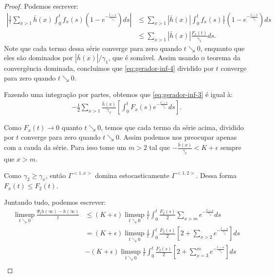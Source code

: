 \begin{proof}
  Podemos escrever:
  \begin{align*}
    \left| \frac{1}{t} \sum_{x > 1} \bar{h}(x) \int_0^t f_x (s) \left(
        1 - e^{-\frac{t-s}{\gamma_1}}
      \right) d s \right| &\leq
  \sum_{x > 1} |\bar{h}(x)| \int_0^t f_x (s) \frac{1}{t}\left(
    1 - e^{-\frac{t-s}{\gamma_1}}
  \right) d s \\
  & \leq \sum_{x > 1} |\bar{h}(x)| \frac{F_x(t)}{\gamma_1} d s  .
  \end{align*}
  Note que cada termo dessa série converge para zero quando $t
  \searrow 0$, enquanto que eles são dominados por $|\bar{h}(x)| /
  \gamma_1$, que é somável. Assim usando o teorema da convergência
  dominada, concluímos que \eqref{eq:gerador-inf-4} dividido por
  $t$ converge para zero quando $t \searrow 0$.

  Fazendo uma integração por partes, obtemos que
  \eqref{eq:gerador-inf-3} é igual à:
  \begin{align*}
    - \frac{1}{2} \sum_{x > 1} \frac{\bar{h}(x)}{\gamma_x} \left[
      \int_0^t F_x (s) e^{-\frac{t-s}{\gamma_x}} ds
    \right].
  \end{align*}

  Como $F_x(t) \to 0$ quanto $t \searrow 0$, temos que cada termo da
  série acima, dividido por $t$ converge para zero quando $t \searrow
  0$. Assim podemos nos preocupar apenas com a cauda da série. Para
  isso tome um $m > 2$ tal que $-\frac{\bar{h}(x)}{\gamma_x} < K +
  \epsilon$ sempre que $x > m$.

  Como $\gamma_2\geq \gamma_x$, então $\Gamma^{<1, x>}$ domina
  estocasticamente $\Gamma^{<1, 2>}$. Dessa forma $F_x(t) \leq
  F_2(t)$.

  Juntando tudo, podemos escrever:
  \begin{align*}
    \limsup_{t \searrow 0} \frac{\Psi_t h(\infty) - h(\infty)}{t}
    &\leq \left( K + \epsilon \right) \limsup_{t \searrow
      0}\frac{1}{t} \int_0^t \frac{F_2(s)}{2} \sum_{x >
      m}e^{-\frac{t-s}{\gamma_x}} ds\\
    &= \left( K + \epsilon \right) \limsup_{t \searrow
      0}\frac{1}{t} \int_0^t \frac{F_2(s)}{2} \left[
      2 + \sum_{x > 2} e^{-\frac{t-s}{\gamma_x}}
    \right] ds\\
    &- \left( K + \epsilon \right) \limsup_{t \searrow
      0}\frac{1}{t} \int_0^t \frac{F_2(s)}{2} \left[
      2 + \sum_{x=3}^m e^{-\frac{t-s}{\gamma_x}}
    \right] ds\\
  \end{align*}


\end{proof}
